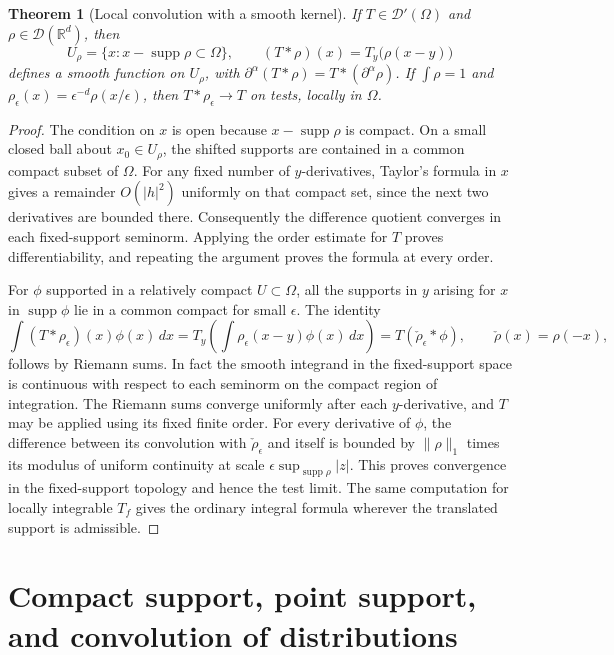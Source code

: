 \documentclass[11pt,oneside,openany]{book}
\newtheorem{theorem}{Theorem}[chapter]
\theoremstyle{definition}
\theoremstyle{remark}
\begin{document}
\begin{theorem}[Local convolution with a smooth kernel]
\label{p102:AN-11-C02-R02}
If \(T\in\mathcal D'(\Omega)\) and \(\rho\in\mathcal D(\mathbb R^d)\), then
\[
 U_\rho=\{x:x-\operatorname{supp}\rho\subset\Omega\},\qquad
 (T*\rho)(x)=T_y\bigl(\rho(x-y)\bigr)
\]
defines a smooth function on \(U_\rho\), with \(\partial^\alpha(T*\rho)=T*(\partial^\alpha\rho)\). If \(\int\rho=1\) and \(\rho_\epsilon(x)=\epsilon^{-d}\rho(x/\epsilon)\), then \(T*\rho_\epsilon\to T\) on tests, locally in \(\Omega\).
\end{theorem}
\begin{proof}
The condition on \(x\) is open because \(x-\operatorname{supp}\rho\) is compact. On a small closed ball about \(x_0\in U_\rho\), the shifted supports are contained in a common compact subset of \(\Omega\). For any fixed number of \(y\)-derivatives, Taylor's formula in \(x\) gives a remainder \(O(|h|^2)\) uniformly on that compact set, since the next two derivatives are bounded there. Consequently the difference quotient converges in each fixed-support seminorm. Applying the order estimate for \(T\) proves differentiability, and repeating the argument proves the formula at every order.

For \(\phi\) supported in a relatively compact \(U\subset\Omega\), all the supports in \(y\) arising for \(x\) in \(\operatorname{supp}\phi\) lie in a common compact for small \(\epsilon\). The identity
\[
 \int (T*\rho_\epsilon)(x)\phi(x)\,dx
 =T_y\!\left(\int \rho_\epsilon(x-y)\phi(x)\,dx\right)
 =T(\check\rho_\epsilon*\phi),\qquad \check\rho(x)=\rho(-x),
\]
follows by Riemann sums. In fact the smooth integrand in the fixed-support space is continuous with respect to each seminorm on the compact region of integration. The Riemann sums converge uniformly after each \(y\)-derivative, and \(T\) may be applied using its fixed finite order. For every derivative of \(\phi\), the difference between its convolution with \(\check\rho_\epsilon\) and itself is bounded by \(\|\rho\|_1\) times its modulus of uniform continuity at scale \(\epsilon \sup_{\operatorname{supp}\rho}|z|\). This proves convergence in the fixed-support topology and hence the test limit. The same computation for locally integrable \(T_f\) gives the ordinary integral formula wherever the translated support is admissible.
\end{proof}

\section{Compact support, point support, and convolution of distributions}
\end{document}
